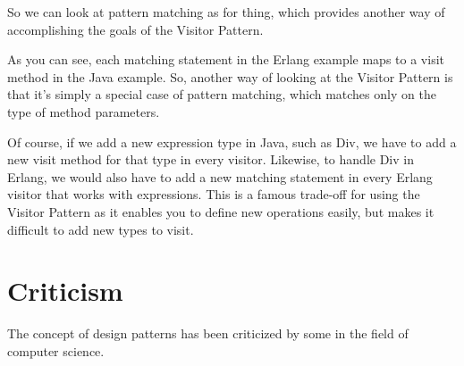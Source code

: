     So we can look at pattern matching as for thing, which provides another way of accomplishing the goals of the Visitor Pattern.

    As you can see, each matching statement in the Erlang example maps to a visit method in the Java example. So, another way of looking at the Visitor Pattern is that it's simply a special case of pattern matching, which matches only on the type of method parameters.

    Of course, if we add a new expression type in Java, such as Div, we have to add a new visit method for that type in every visitor. Likewise, to handle Div in Erlang, we would also have to add a new matching statement in every Erlang visitor that works with expressions. This is a famous trade-off for using the Visitor Pattern as it enables you to define new operations easily, but makes it difficult to add new types to visit.


\section{Criticism}

The concept of design patterns has been criticized by some in the field of computer science.~\cite{res9}

